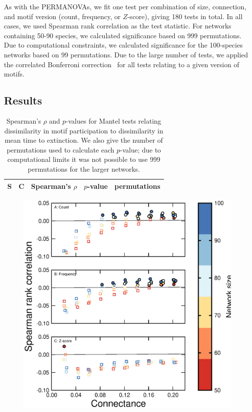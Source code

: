 \documentclass[12pt]{article}
\begin{document}
		As with the PERMANOVAs, we fit one test per combination of size, connection, and motif version (count, frequency, or $Z$-score), giving 180 tests in total.
		In all cases, we used Spearman rank correlation as the test statistic.
		For networks containing 50-90 species, we calculated significance based on 999 permutations.
		Due to computational constraints, we calculated significance for the 100-species networks based on 99 permutations.
		Due to the large number of tests, we applied the correlated Bonferroni correction~\citep{Drezner2016} for all tests relating to a given version of motifs.


	\subsection*{Results}

		\begin{table}[hb!]
			\caption{Spearman's $\rho$ and $p$-values for Mantel tests relating dissimilarity in motif participation to dissimilarity in mean time to extinction. We also give the number of permutations used to calculate each $p$-value; due to computational limits it was not possible to use 999 permutations for the larger networks.}
			\label{Mantetab}
			\begin{tabular}{l l | l l | l}
			S & C & Spearman's $\rho$ & $p$-value & permutations\\
			\hline
			\end{tabular}
			\end{table}



		\begin{figure}[hb!]
			\includegraphics[height=.75\textheight]{figures/mantel.eps}
			\caption{}
			\label{Mantelfig}
			\end{figure}
\end{document}
